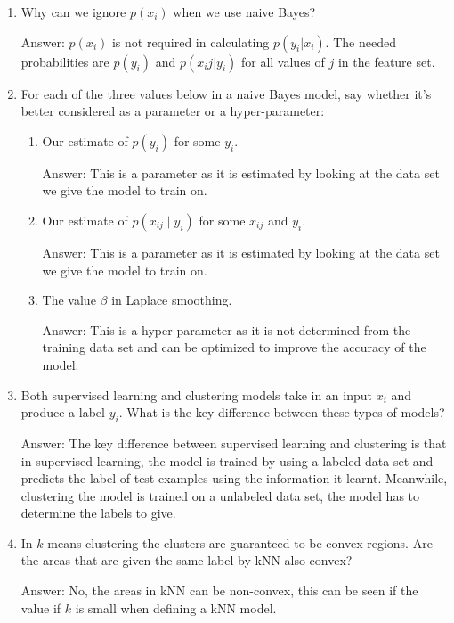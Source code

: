 \documentclass{article}
\newcommand{\gre}[1]{\textcolor{gre}{#1}}
\newcommand\ans[1]{\par\gre{Answer: #1}}
\begin{document}
\begin{enumerate}
        \ans{An increase in false positive rate is acceptable if the cost of a false positive is significantly lower compared to the cost of a false negative. An example of this would be cancer detection where a false positive would lead to more testing to confirm the diagnosis but a false negative could mean overseeing a cancer growth that could become terminal if not addressed immediately.}

        \item Why can we ignore $p(x_i)$ when we use naive Bayes?

        \ans{$p(x_i)$ is not required in calculating $p(y_i|x_i)$. The needed probabilities are $p(y_i)$ and $p(x_ij|y_i)$ for all values of $j$ in the feature set.}
        \newpage

        \item For each of the three values below in a naive Bayes model, say whether it's better considered as a parameter or a hyper-parameter:
        \begin{enumerate}
            \item Our estimate of $p(y_i)$ for some $y_i$.
            \ans{This is a parameter as it is estimated by looking at the data set we give the model to train on.}
            \item Our estimate of $p(x_{ij} \mid y_i)$ for some $x_{ij}$ and $y_i$.
            \ans{This is a parameter as it is estimated by looking at the data set we give the model to train on.}
            \item The value $\beta$ in Laplace smoothing.
            \ans{This is a hyper-parameter as it is not determined from the training data set and can be optimized to improve the accuracy of the model.}
        \end{enumerate}

        \item Both supervised learning and clustering models take in an input $x_i$ and produce a label $y_i$. What is the key difference between these types of models?

        \ans{The key difference between supervised learning and clustering is that in supervised learning, the model is trained by using a labeled data set and predicts the label of test examples using the information it learnt. Meanwhile, clustering the model is trained on a unlabeled data set, the model has to determine the labels to give.}

        \item In $k$-means clustering the clusters are guaranteed to be convex regions. Are the areas that are given the same label by kNN also convex?

        \ans{No, the areas in kNN can be non-convex, this can be seen if the value if $k$ is small when defining a kNN model.}
    \end{enumerate}
\end{document}
